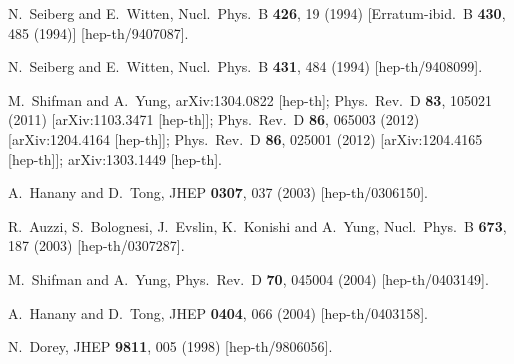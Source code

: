 \documentclass[12pt]{article}
\begin{document}
\begin{thebibliography}{99}
  N.~Seiberg and E.~Witten,
  Nucl.\ Phys.\ B {\bf 426}, 19 (1994)
  [Erratum-ibid.\ B {\bf 430}, 485 (1994)]
  [hep-th/9407087].

  N.~Seiberg and E.~Witten,
  Nucl.\ Phys.\ B {\bf 431}, 484 (1994)
  [hep-th/9408099].

  M.~Shifman and A.~Yung,
  arXiv:1304.0822 [hep-th];
  Phys.\ Rev.\ D {\bf 83}, 105021 (2011)
  [arXiv:1103.3471 [hep-th]];
  Phys.\ Rev.\ D {\bf 86}, 065003 (2012)
  [arXiv:1204.4164 [hep-th]];
  Phys.\ Rev.\ D {\bf 86}, 025001 (2012)
  [arXiv:1204.4165 [hep-th]];
  arXiv:1303.1449 [hep-th].
  
  A.~Hanany and D.~Tong,
  JHEP {\bf 0307}, 037 (2003)
  [hep-th/0306150].

  R.~Auzzi, S.~Bolognesi, J.~Evslin, K.~Konishi and A.~Yung,
  Nucl.\ Phys.\ B {\bf 673}, 187 (2003)
  [hep-th/0307287].

  M.~Shifman and A.~Yung,
  Phys.\ Rev.\ D {\bf 70}, 045004 (2004)
  [hep-th/0403149].

  A.~Hanany and D.~Tong,
  JHEP {\bf 0404}, 066 (2004)
  [hep-th/0403158].

  N.~Dorey,
  JHEP {\bf 9811}, 005 (1998)
  [hep-th/9806056].


\end{thebibliography}
\end{document}
